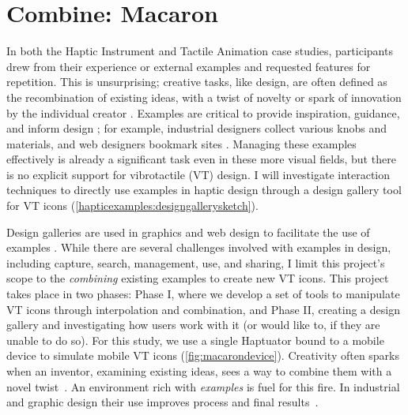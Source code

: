 


\chapter{Combine: Macaron}
\label{ch:macaron}

%

In both the Haptic Instrument and Tactile Animation case studies, participants drew from their experience or external examples and requested features for repetition.
This is unsurprising; creative tasks, like design, are often defined as the recombination of existing ideas, with a twist of novelty or spark of innovation by the individual creator \cite{Warr2005}.
Examples are critical to provide inspiration, guidance, and inform design \cite{Herring2009,Buxton2007}; for example,
industrial designers collect various knobs and materials, and web designers bookmark sites \cite{Herring2009}.
Managing these examples effectively is already a significant task even in these more visual fields, but there is no explicit support for vibrotactile (VT) design.
I will investigate interaction techniques to directly use examples in haptic design through a design gallery tool for VT icons (\autoref{hapticexamples:designgallerysketch}).



Design galleries are used in graphics and web design to facilitate the use of examples \cite{Lee2010a,Marks1997}.
While there are several challenges involved with examples in design, including capture, search, management, use, and sharing, I limit this project's scope to the \emph{combining} existing examples to create new VT icons.
This project takes place in two phases: Phase I, where we develop a set of tools to manipulate VT icons through interpolation and combination, and Phase II, creating a design gallery and investigating how users work with it (or would like to, if they are unable to do so).
For this study, we use a single Haptuator bound to a mobile device to simulate mobile VT icons (\autoref{fig:macarondevice}).
Creativity often sparks when an inventor, examining existing ideas, sees a way to combine them with a novel twist~\cite{Warr2005}.
An environment rich with \emph{examples} is fuel for this fire. In industrial and graphic design \cite{Buxton2007,Herring2009} their use improves process and final results~\cite{Dow2011,Lee2010a}.

